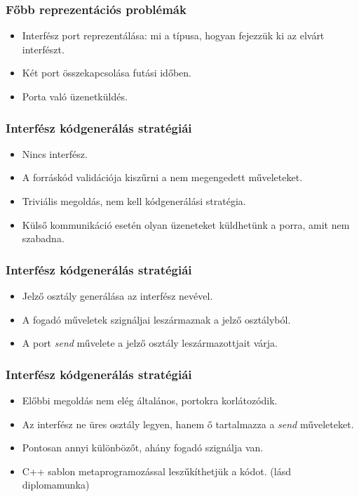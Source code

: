 \documentclass[11pt]{beamer}
\begin{document}
\begin{frame}[fragile]	
	\frametitle{Főbb reprezentációs problémák}	
	\begin{itemize}
	\item Interfész port reprezentálása: mi a típusa, hogyan fejezzük ki az elvárt interfészt.
	\item Két port összekapcsolása futási időben.
	\item Porta való üzenetküldés.
	\end{itemize}
	
\end{frame}

\begin{frame}
	\frametitle{Interfész kódgenerálás stratégiái}
	
	\begin{itemize}
	\item Nincs interfész.
	\item A forráskód validációja kiszűrni a nem megengedett műveleteket.
	\item Triviális megoldás, nem kell kódgenerálási stratégia.
	\item Külső kommunikáció esetén olyan üzeneteket küldhetünk a porra, amit nem szabadna.
	
	\end{itemize}

\end{frame}

\begin{frame}
	\frametitle{Interfész kódgenerálás stratégiái}
	
	\begin{itemize}
	\item Jelző osztály generálása az interfész nevével.
	\item A fogadó műveletek szignáljai leszármaznak a jelző osztályból.
	\item A port \textit{send} művelete a jelző osztály leszármazottjait várja.	
	\end{itemize}

\end{frame}

\begin{frame}
	\frametitle{Interfész kódgenerálás stratégiái}
	
	\begin{itemize}
	\item Előbbi megoldás nem elég általános, portokra korlátozódik.
	\item Az interfész ne üres osztály legyen, hanem ő tartalmazza a \textit{send} műveleteket.
	\item Pontosan annyi különbözőt, ahány fogadó szignálja van.
	\item C++ sablon metaprogramozással leszűkíthetjük a kódot. (lásd diplomamunka) 	
	\end{itemize}

\end{frame}
\end{document}
